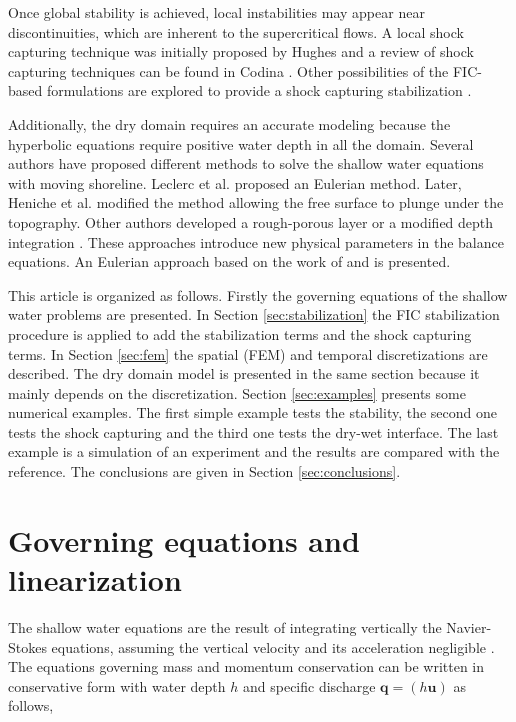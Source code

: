 \documentclass[a4paper,12pt]{article}
\begin{document}
Once global stability is achieved, local instabilities may appear near discontinuities, which are inherent to the supercritical flows.
A local shock capturing technique was initially proposed by Hughes \cite{hughes1986} and a review of shock capturing techniques can be found in Codina \cite{codina2011}.
Other possibilities of the FIC-based formulations are explored to provide a shock capturing stabilization \cite{cotela2016}.

Additionally, the dry domain requires an accurate modeling because the hyperbolic equations require positive water depth in all the domain.
Several authors have proposed different methods to solve the shallow water equations with moving shoreline. Leclerc et al. \cite{leclerc1990} proposed an Eulerian method. Later, Heniche et al. \cite{heniche2000} modified the method allowing the free surface to plunge under the topography.
Other authors developed a rough-porous layer \cite{candy2017,barros2011} or a modified depth integration \cite{defina2000}. These approaches introduce new physical parameters in the balance equations.
An Eulerian approach based on the work of \cite{leclerc1990} and \cite{heniche2000} is presented.


This article is organized as follows. Firstly the governing equations of the shallow water problems are presented.
In Section \ref{sec:stabilization} the FIC stabilization procedure is applied to add the stabilization terms and the shock capturing terms.
In Section \ref{sec:fem} the spatial (FEM) and temporal discretizations are described.
The dry domain model is presented in the same section because it mainly depends on the discretization.
Section \ref{sec:examples} presents some numerical examples.
The first simple example tests the stability, the second one tests the shock capturing and the third one tests the dry-wet interface.
The last example is a simulation of an experiment and the results are compared with the reference.
The conclusions are given in Section \ref{sec:conclusions}.


\section{Governing equations and linearization}

The shallow water equations are the result of integrating vertically the Navier-Stokes equations, assuming the vertical velocity and its acceleration negligible \cite{abbot1979,zien3}.
The equations governing mass and momentum conservation can be written in conservative form with water depth $h$ and specific discharge $\mathbf{q}=(h\mathbf{u})$ as follows,
\end{document}
